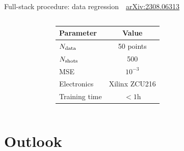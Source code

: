 \documentclass[aspectratio=169, 10pt, xcolor={svgnames}, hyperref={linkcolor=black}]{beamer}
\begin{document}
\begin{frame}{Full-stack procedure: data regression \hfill \faBook\,\, \href{https://arxiv.org/abs/2308.06313}{arXiv:2308.06313}}
\begin{columns}
\begin{figure}
   \end{figure}
   \vspace{-0.3cm}
 \begin{table}
   \small
   \begin{tabular}{lc}
   \hline \hline
     \textbf{Parameter}     & \textbf{Value}  \\ \hline
     $N_{\rm data}$      & 50 points \\
     $N_{\rm shots}$ & 500 \\
     MSE & $10^{-3}$ \\
     Electronics & Xilinx ZCU216 \\
     Training time & $<1$h \\
   \hline \hline
   \end{tabular}
 \end{table}

   \end{columns}

 \end{frame}


\section{Outlook}
\end{document}
